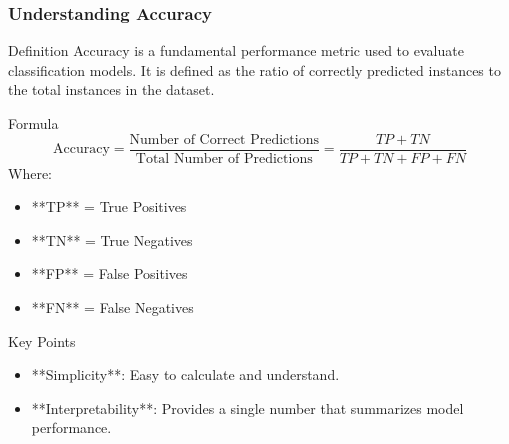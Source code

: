 \documentclass[aspectratio=169]{beamer}
\begin{document}
\begin{frame}[fragile]
    \frametitle{Understanding Accuracy}
    \begin{block}{Definition}
        Accuracy is a fundamental performance metric used to evaluate classification models. It is defined as the ratio of correctly predicted instances to the total instances in the dataset.
    \end{block}

    \begin{block}{Formula}
        \begin{equation}
            \text{Accuracy} = \frac{\text{Number of Correct Predictions}}{\text{Total Number of Predictions}} = \frac{TP + TN}{TP + TN + FP + FN}
        \end{equation}
        Where:
        \begin{itemize}
            \item **TP** = True Positives
            \item **TN** = True Negatives
            \item **FP** = False Positives
            \item **FN** = False Negatives
        \end{itemize}
    \end{block}

    \begin{block}{Key Points}
        \begin{itemize}
            \item **Simplicity**: Easy to calculate and understand.
            \item **Interpretability**: Provides a single number that summarizes model performance.
        \end{itemize}
    \end{block}
\end{frame}
\end{document}
